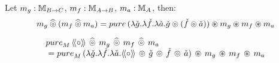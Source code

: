 \begin{lemma}\label{lemma:pappl_comp_appl}
Let $m_g:\mathbb{M}_{B\rightarrow C}$, $m_f:\mathbb{M}_{A\rightarrow B}$, $m_a:\mathbb{M}_{A}$, then:
$$
m_g \alift{\pappl} (m_f \alift{\pappl} m_a)
 = \apure\, (\lambda \pstr{g}. \lambda \pstr{f}. \lambda \pstr{a}. \pstr{g} \pappl (\pstr{f}\pappl \pstr{a})) \appl m_g \appl m_f \appl m_a
$$
\end{lemma}

\begin{lemma}\label{lemma:ppair}
$$
\begin{array}{l}
\apure_M\,\ppair{\comp}\, \alift{\pappl}\, m_g\, \alift{\pappl}\, m_f\, \alift{\pappl}\, m_a \\
{}= \apure_M\,(\lambda \pstr{g}. \lambda \pstr{f}. \lambda \pstr{a}. \ppair{\comp}\, \pappl\, \pstr{g} \, \pappl\, \pstr{f} \, \pappl\, \pstr{a})\, \appl\, m_g\, \appl\, m_f\, \appl\, m_a 
\end{array}
$$
\end{lemma}

